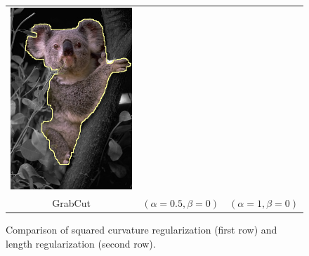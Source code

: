 \documentclass[runningheads]{llncs}
\begin{document}
\begin{figure}
\begin{tabular}{ccc}
	\includegraphics[scale=0.25]{images/segmentation/bc/coala/r3/lg2_sq0_dt1_it50.png} \\

	GrabCut & $(\alpha=0.5, \beta=0)$ & $(\alpha=1, \beta=0)$
\end{tabular}	
\caption{Comparison of squared curvature regularization (first row) and length regularization (second row). }
\label{fig:parameters-influence}
\end{figure}
\end{document}
